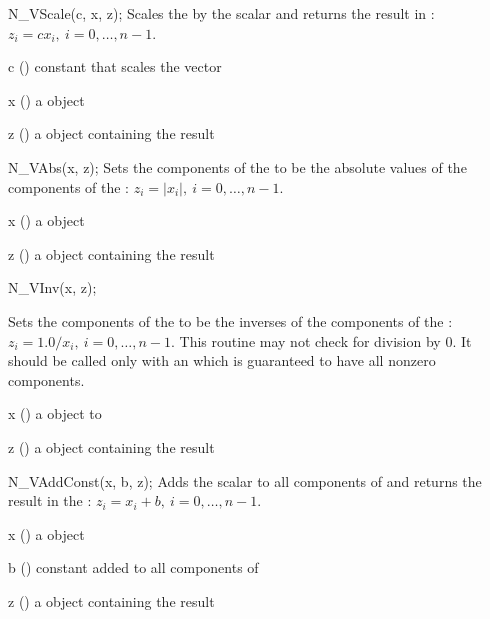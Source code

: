 {
  N\_VScale(c, x, z);
}
{
  Scales the   by the  scalar 
  and returns the result in : $z_i = c x_i , \: i=0,\ldots,n-1$.
}
{
  \begin{args}[c]
  \item[c] () constant that scales the vector 
  \item[x] () a {\nvector} object
  \item[z] () a {\nvector} object containing the result
  \end{args}
}
{}
{}

{
  N\_VAbs(x, z);
}
{
  Sets the components of the   to be the absolute
  values of the components of the  :
  $z_i = | x_i | , \: i=0,\ldots,n-1$.
}
{
  \begin{args}[x]
  \item[x] () a {\nvector} object
  \item[z] () a {\nvector} object containing the result
  \end{args}
}
{}
{}

{
  N\_VInv(x, z);
}
{

  Sets the components of the   to be the inverses
  of the components of the  :
  $z_i = 1.0 /  x_i  , \: i=0,\ldots,n-1$. This routine
  may not check for division by $0$. It should be called only with an
   which is guaranteed to have all nonzero components.
}
{
  \begin{args}[x]
  \item[x] () a {\nvector} object to
  \item[z] () a {\nvector} object containing the result
  \end{args}
}
{}
{}

{
  N\_VAddConst(x, b, z);
}
{
  Adds the  scalar  to all components of 
  and returns the result in the  :
  $z_i = x_i + b , \: i=0,\ldots,n-1$.
}
{
  \begin{args}[x]
  \item[x] () a {\nvector} object
  \item[b] () constant added to all components of 
  \item[z] () a {\nvector} object containing the result
  \end{args}
}
{}
{}

